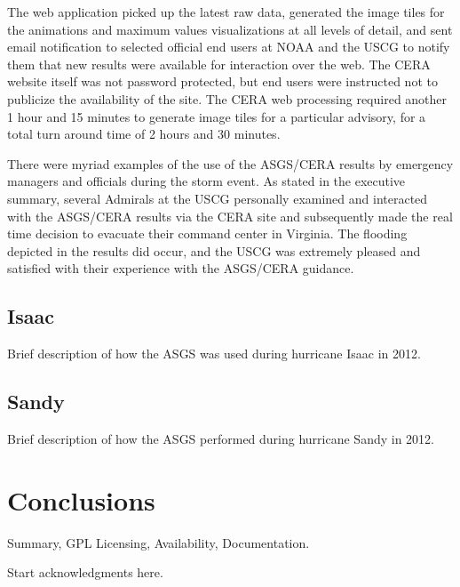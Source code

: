 \documentclass[12pt]{article}
\begin{document}
The web application picked up the latest raw data, generated the 
image tiles for the animations and maximum values visualizations at 
all levels of detail, and sent email notification to selected 
official end users at NOAA and the USCG to notify them that new 
results were available for interaction over the web. The CERA 
website itself was not password protected, but end users were 
instructed not to publicize the availability of the site. The CERA 
web processing required another 1 hour and 15 minutes to generate 
image tiles for a particular advisory, for a total turn around time 
of 2 hours and 30 minutes.

There were myriad examples of the use of the ASGS/CERA results by 
emergency managers and officials during the storm event. As stated 
in the executive summary, several Admirals at the USCG personally 
examined and interacted with the ASGS/CERA results via the CERA site 
and subsequently made the real time decision to evacuate their 
command center in Virginia. The flooding depicted in the results did 
occur, and the USCG was extremely pleased and satisfied with their 
experience with the ASGS/CERA guidance.

\subsection{Isaac}

Brief description of how the ASGS was used during hurricane Isaac in 2012.

\subsection{Sandy}

Brief description of how the ASGS performed during hurricane Sandy in 2012.

\section{Conclusions}

Summary, GPL Licensing, Availability, Documentation.

\begin{acknowledgment} 
Start acknowledgments here.
\end{acknowledgment}
\end{document}
